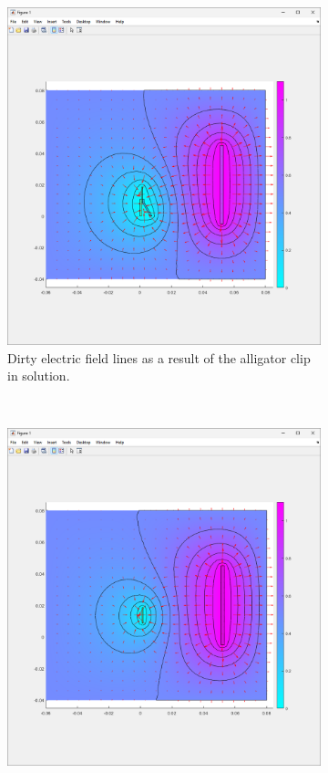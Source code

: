 \begin{figure}
    \centering
    \begin{subfigure}[t]{0.45\textwidth}
        \includegraphics[width=\textwidth]{Main/Ch4/dirty_field_lines_aligator.png}
        \caption{Dirty electric field lines as a result of the alligator clip in solution.}
    \end{subfigure}
    ~
    \begin{subfigure}[t]{0.45\textwidth}
        \includegraphics[width=\textwidth]{Main/Ch4/clean_field_lines.png}

\end{subfigure}
\end{figure}
